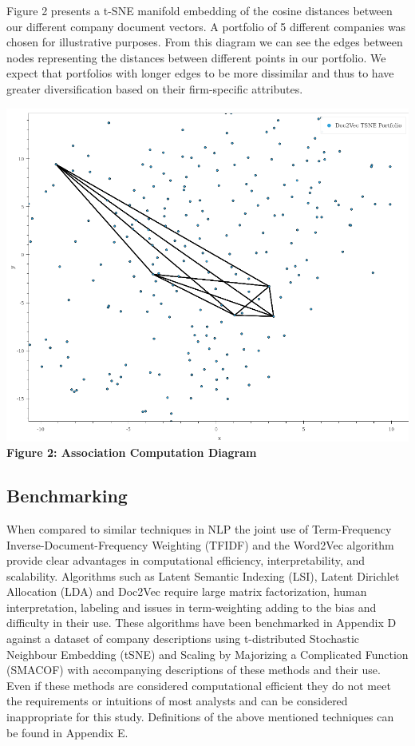 \documentclass[11pt]{article}
\makeatletter
\def\maxwidth{\ifdim\Gin@nat@width>\linewidth\linewidth
    \else\Gin@nat@width\fi}
\let\Oldincludegraphics\includegraphics
\renewcommand{\includegraphics}[1]{\Oldincludegraphics[width=.8\maxwidth]{#1}}
\makeatother
\begin{document}
Figure 2 presents a t-SNE manifold embedding of the cosine distances
between our different company document vectors. A portfolio of 5
different companies was chosen for illustrative purposes. From this
diagram we can see the edges between nodes representing the distances
between different points in our portfolio. We expect that portfolios
with longer edges to be more dissimilar and thus to have greater
diversification based on their firm-specific attributes.

\includegraphics{../experiments/media/Association Computation Diagram.png}\\

\textbf{Figure 2: Association Computation Diagram}

\hypertarget{benchmarking}{%
\subsection{Benchmarking}\label{benchmarking}}

When compared to similar techniques in NLP the joint use of
Term-Frequency Inverse-Document-Frequency Weighting (TFIDF) and the
Word2Vec algorithm provide clear advantages in computational efficiency,
interpretability, and scalability. Algorithms such as Latent Semantic
Indexing (LSI), Latent Dirichlet Allocation (LDA) and Doc2Vec require
large matrix factorization, human interpretation, labeling and issues in
term-weighting adding to the bias and difficulty in their use. These
algorithms have been benchmarked in Appendix D against a dataset of
company descriptions using t-distributed Stochastic Neighbour Embedding
(tSNE) and Scaling by Majorizing a Complicated Function (SMACOF) with
accompanying descriptions of these methods and their use. Even if these
methods are considered computational efficient they do not meet the
requirements or intuitions of most analysts and can be considered
inappropriate for this study. Definitions of the above mentioned
techniques can be found in Appendix E.
\end{document}
